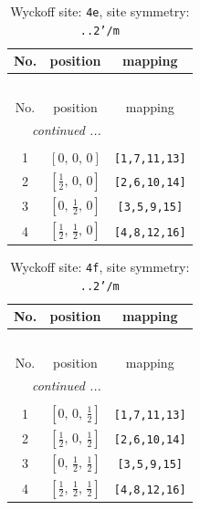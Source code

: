 \documentclass[fleqn,8pt]{jsarticle}
\begin{document}
\begin{longtable}{ccc}
\caption{Wyckoff site: {\tt 4e}, site symmetry: {\tt ..2'/m}}
 \\
 \hline \hline
No. & position & mapping \\ \hline \endfirsthead

\multicolumn{2}{l}{\tablename\ \thetable{}} \\
 \hline \hline
No. & position & mapping \\ \hline \endhead

 \hline \hline
\multicolumn{2}{r}{\footnotesize\it continued ...} \\ \endfoot

 \hline \hline
\multicolumn{2}{r}{} \\ \endlastfoot

1 & $\left[ 0,\, 0,\, 0 \right]$ & {\tt [1,7,11,13]} \\ \hline
2 & $\left[ \frac{1}{2},\, 0,\, 0 \right]$ & {\tt [2,6,10,14]} \\ \hline
3 & $\left[ 0,\, \frac{1}{2},\, 0 \right]$ & {\tt [3,5,9,15]} \\ \hline
4 & $\left[ \frac{1}{2},\, \frac{1}{2},\, 0 \right]$ & {\tt [4,8,12,16]} \\
\end{longtable}
\renewcommand{\arraystretch}{1.2}
\begin{longtable}{ccc}
\caption{Wyckoff site: {\tt 4f}, site symmetry: {\tt ..2'/m}}
 \\
 \hline \hline
No. & position & mapping \\ \hline \endfirsthead

\multicolumn{2}{l}{\tablename\ \thetable{}} \\
 \hline \hline
No. & position & mapping \\ \hline \endhead

 \hline \hline
\multicolumn{2}{r}{\footnotesize\it continued ...} \\ \endfoot

 \hline \hline
\multicolumn{2}{r}{} \\ \endlastfoot

1 & $\left[ 0,\, 0,\, \frac{1}{2} \right]$ & {\tt [1,7,11,13]} \\ \hline
2 & $\left[ \frac{1}{2},\, 0,\, \frac{1}{2} \right]$ & {\tt [2,6,10,14]} \\ \hline
3 & $\left[ 0,\, \frac{1}{2},\, \frac{1}{2} \right]$ & {\tt [3,5,9,15]} \\ \hline
4 & $\left[ \frac{1}{2},\, \frac{1}{2},\, \frac{1}{2} \right]$ & {\tt [4,8,12,16]} \\
\end{longtable}
\end{document}
